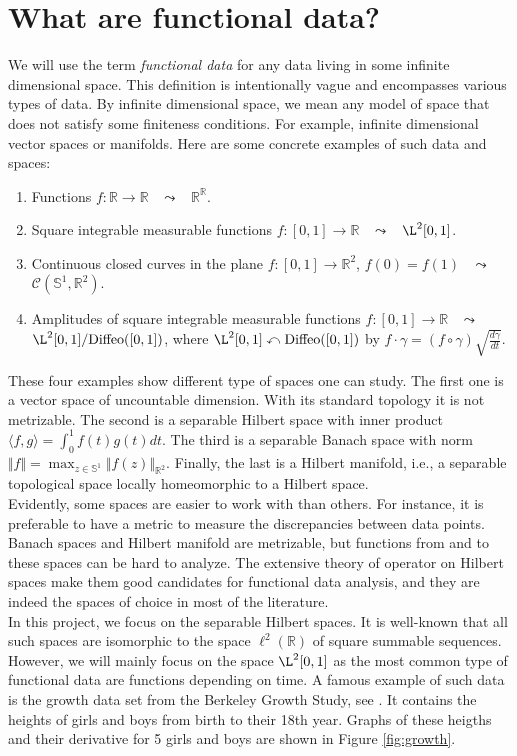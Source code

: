 \documentclass[10pt, a4paper]{report}
\newcommand{\R}[0]{\mathbb{R}}
\theoremstyle{definition}
\theoremstyle{remark}
\begin{document}
\section{What are functional data?}
We will use the term \textit{functional data} for any data living in some infinite dimensional space. This definition is intentionally vague and encompasses various types of data. By infinite dimensional space, we mean any model of space that does not satisfy some finiteness conditions. For example, infinite dimensional vector spaces or manifolds. Here are some concrete examples of such data and spaces:
\begin{enumerate}
	\item Functions $f:\R \to \R$ \ $\leadsto$ \ $\R^\R$. 
	\item Square integrable measurable functions $f:[0,1] \to \R$ \ $\leadsto$ \ $\L^2[0,1]$.
	\item Continuous closed curves in the plane $f: [0,1] \to \R^2$, $f(0)=f(1)$ \ $\leadsto$ \ $\mathcal{C}(\mathbb{S}^1, \R^2)$.
	\item Amplitudes of square integrable measurable functions $f:[0,1] \to \R$ \ $\leadsto$ \ $\L^2[0,1]/\mathrm{Diffeo}([0,1])$, where $\L^2[0,1] \curvearrowleft \mathrm{Diffeo}([0,1])$ by $f \cdot \gamma = (f\circ \gamma)\sqrt{\frac{d\gamma}{dt}}$.
\end{enumerate}
These four examples show different type of spaces one can study. The first one is a vector space of uncountable dimension. With its standard topology it is not metrizable. The second is a separable Hilbert space with inner product $\langle f,g\rangle = \int_{0}^{1}f(t)g(t)dt$. The third is a separable Banach space with norm $\Vert f \Vert = \max_{z \in \mathbb{S}^1} \Vert f(z)\Vert_{\R^2}$. Finally, the last is a Hilbert manifold, i.e., a separable topological space locally homeomorphic to a Hilbert space.\\
Evidently, some spaces are easier to work with than others. For instance, it is preferable to have a metric to measure the discrepancies between data points. Banach spaces and Hilbert manifold are metrizable, but functions from and to these spaces can be hard to analyze. The extensive theory of operator on Hilbert spaces make them good candidates for functional data analysis, and they are indeed the spaces of choice in most of the literature.\\
In this project, we focus on the separable Hilbert spaces. It is well-known that all such spaces are isomorphic to the space $\ell^2(\R)$ of square summable sequences. However, we will mainly focus on the space $\L^2[0,1]$ as the most common type of functional data are functions depending on time. A famous example of such data is the growth data set from the Berkeley Growth Study, see \cite{growth}. It contains the heights of girls and boys from birth to their 18th year. Graphs of these heigths and their derivative for 5 girls and boys are shown in Figure \ref{fig:growth}.
\end{document}
